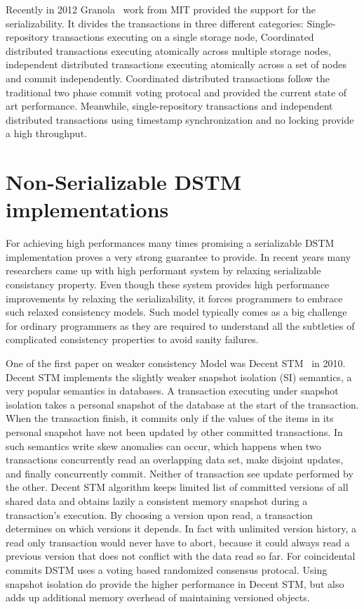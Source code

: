 \documentclass[12pt,english]{report}
\begin{document}
Recently in 2012 Granola~\cite{cowling2012granola} work from MIT provided the support for the serializability. It divides the transactions in three different categories: Single-repository transactions executing on a single storage node, Coordinated distributed transactions executing atomically across multiple storage nodes, independent distributed transactions executing atomically across a set of nodes and commit independently. Coordinated distributed transactions follow the traditional two phase commit voting protocal and provided the current state of art performance. Meanwhile, single-repository transactions and independent distributed transactions using timestamp synchronization and no locking provide a high throughput.  

\section{Non-Serializable DSTM implementations}

For achieving high performances many times promising a serializable DSTM implementation proves a very strong guarantee to provide. In recent years many researchers came up with high performant system by relaxing  serializable consistancy property. Even though these system provides high performance improvements by relaxing the serializability, it forces programmers to embrace such relaxed consistency models. Such model typically comes as a big challenge for ordinary programmers as they are required to understand all the subtleties of complicated consistency properties to avoid sanity failures.

One of the first paper on weaker consistency Model was Decent STM~\cite{DecentSTM:5470446} in 2010. Decent STM implements the slightly weaker snapshot isolation (SI) semantics, a very popular semantics in databases. A transaction executing under snapshot isolation takes a 
personal snapshot of the database at the start of the transaction. When the transaction
finish, it commits only if the values of the items in its personal snapshot have not been updated by other committed transactions. In such semantics write skew anomalies can occur, which happens when two transactions concurrently read an overlapping data set, make disjoint updates, and finally concurrently commit. Neither of transaction see update performed by the other. Decent STM algorithm keeps limited list of committed versions of all shared data and obtains lazily a consistent memory snapshot during a transaction’s execution. By choosing a version upon read, a transaction determines on which versions it depends. In fact with unlimited version history, a read only transaction would never have to abort, because
it could always read a previous version that does not conflict with the data read so far. For coincidental commits DSTM uses a voting based randomized consensus protocal. Using snapshot isolation do provide the higher performance in Decent STM, but also adds up additional memory overhead of maintaining versioned objects.  
\end{document}
